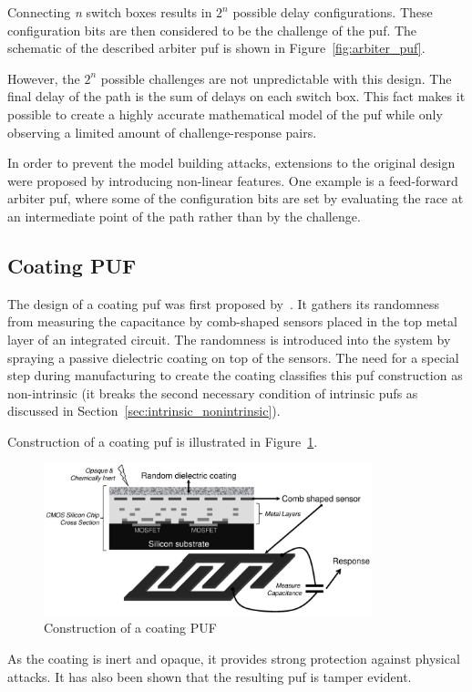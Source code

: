 Connecting \emph{n} switch boxes results in $2^n$ possible delay configurations. These configuration bits are then considered to be the challenge of the \gls{puf}. The schematic of the described arbiter \gls{puf} is shown in Figure~\ref{fig:arbiter_puf}.

However, the $2^n$ possible challenges are not unpredictable with this design. The final delay of the path is the sum of delays on each switch box. This fact makes it possible to create a highly accurate mathematical model of the \gls{puf} while only observing a limited amount of challenge-response pairs.~\cite{Lee2004}

In order to prevent the model building attacks, extensions to the original design were proposed by introducing non-linear features. One example is a feed-forward arbiter \gls{puf}, where some of the configuration bits are set by evaluating the race at an intermediate point of the path rather than by the challenge.~\cite{Lee2005}

\subsection{Coating PUF}

The design of a coating \gls{puf} was first proposed by~\cite{Tuyls2006}. It gathers its randomness from measuring the capacitance by comb-shaped sensors placed in the top metal layer of an integrated circuit. The randomness is introduced into the system by spraying a passive dielectric coating on top of the sensors. The need for a special step during manufacturing to create the coating classifies this \gls{puf} construction as non-intrinsic (it breaks the second necessary condition of intrinsic \glspl{puf} as discussed in Section~\ref{sec:intrinsic_nonintrinsic}).~\cite{Maes2010}

Construction of a coating \gls{puf} is illustrated in Figure~\ref{fig:coating_puf}.

\begin{figure}[h!]
    \centering
    \captionsetup{justification=centering,margin=0.5cm}
    \includegraphics[width=0.85\textwidth]{images/coating_puf.png}
    \caption[Construction of a coating PUF]{Construction of a coating PUF~\cite{Maes2012}}
    \label{fig:coating_puf}
\end{figure}

As the coating is inert and opaque, it provides strong protection against physical attacks. It has also been shown that the resulting \gls{puf} is tamper evident.~\cite{Tuyls2006}

